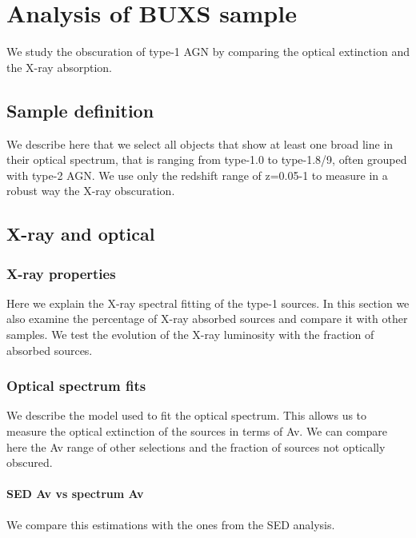 

\chapter{Analysis of BUXS sample}
\label{chap:type1}

We study the obscuration of type-1 AGN by comparing the optical extinction and the X-ray absorption.


\section{Sample definition}
\label{sec5:samp}

We describe here that we select all objects that show at least one broad line in their optical spectrum, that is ranging from type-1.0 to type-1.8/9, often grouped with type-2 AGN. We use only the redshift range of z=0.05-1 to measure in a robust way the X-ray obscuration.

\section{X-ray and optical}

\subsection{X-ray properties}

Here we explain the X-ray spectral fitting of the type-1 sources. In this section we also examine the percentage of X-ray absorbed sources and compare it with other samples. We test the evolution of the X-ray luminosity with the  fraction of absorbed sources.


\subsection{Optical spectrum fits}

We describe the model used to fit the optical spectrum. This allows us to measure the optical extinction of the sources in terms of Av. We can compare here the Av range of other selections and the fraction of sources not optically obscured.

\subsubsection{SED Av vs spectrum Av}

We compare this estimations with the ones from the SED analysis.

